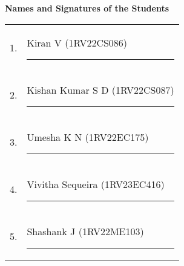 \begin{titlepage}
    \vspace{1.5cm}
    \noindent\textbf{Names and Signatures of the Students}
    \vspace{0.5cm}
    
    \begin{tabular}{ll}
    1. & Kiran V (1RV22CS086) \hfill \rule{5cm}{0.4pt} \\
    2. & Kishan Kumar S D (1RV22CS087) \hfill \rule{5cm}{0.4pt} \\
    3. & Umesha K N (1RV22EC175) \hfill \rule{5cm}{0.4pt} \\
    4. & Vivitha Sequeira (1RV23EC416) \hfill \rule{5cm}{0.4pt} \\
    5. & Shashank J (1RV22ME103) \hfill \rule{5cm}{0.4pt} \\
    \end{tabular}
    
    \end{titlepage}
    
